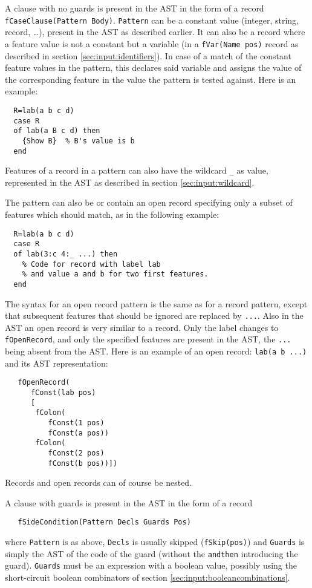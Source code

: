 \documentclass[a4paper]{memoir}
\begin{document}
A clause with no guards is present in the AST in the form of a record \lstinline!fCaseClause(Pattern Body)!. \lstinline!Pattern! can be a constant value (integer, string, record, \ldots), present in the AST as described earlier. It can also be a record where a feature value is not a constant but a variable (in a \lstinline!fVar(Name pos)! record as described in section \ref{sec:input:identifiers}). In case of a match of the constant feature values in the pattern, this declares said variable and assigns the value of the corresponding feature in the value the pattern is tested against. Here is an example:
\begin{lstlisting}
  R=lab(a b c d)
  case R
  of lab(a B c d) then
    {Show B}  % B's value is b
  end
\end{lstlisting}
Features of a record in a pattern can also have the wildcard \lstinline!_! as value, represented in the AST as described in section \ref{sec:input:wildcard}.

The pattern can also be or contain an open record specifying only a subset of features which should match, as in the following example:
\begin{lstlisting}
  R=lab(a b c d)
  case R
  of lab(3:c 4:_ ...) then
    % Code for record with label lab
    % and value a and b for two first features.
  end
\end{lstlisting}
The syntax for an open record pattern is the same as for a record pattern, except that subsequent features that should be ignored are replaced by \lstinline!...!. Also in the AST an open record is very similar to a record. Only the label changes to \lstinline!fOpenRecord!, and only the specified features are present in the AST, the \lstinline!...! being absent from the AST. Here is an example of an open record:
\lstinline!lab(a b ...)! 
and its AST representation:
\begin{lstlisting}
   fOpenRecord(
      fConst(lab pos)
      [
       fColon(
          fConst(1 pos)
          fConst(a pos))
       fColon(
          fConst(2 pos)
          fConst(b pos))])
\end{lstlisting}

Records and open records can of course be nested.

A clause with guards is present in the AST in the form of a record
\begin{lstlisting}
   fSideCondition(Pattern Decls Guards Pos)
\end{lstlisting}
where \lstinline!Pattern!
is as above, \lstinline!Decls! is usually skipped
(\lstinline!fSkip(pos)!)%
and \lstinline!Guards! is simply the AST of the code of the guard (without the \lstinline!andthen! introducing the guard).
\lstinline!Guards! must be an expression with a boolean value, possibly using
the short-circuit boolean combinators of section \ref{sec:input:booleancombinations}.
\end{document}
